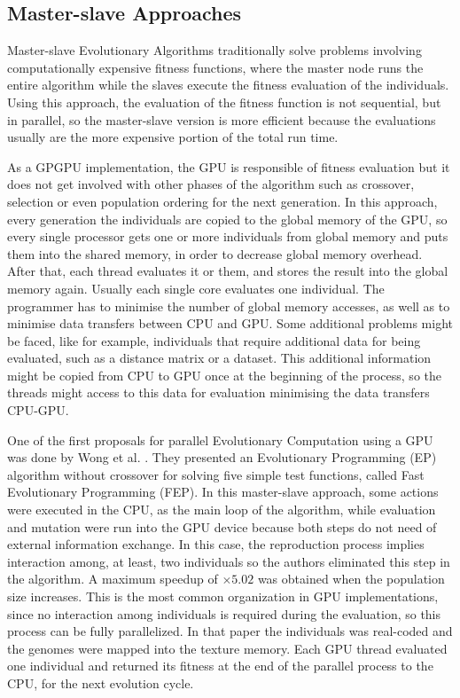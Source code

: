 \documentclass{comjnl}
\begin{document}
\subsection{Master-slave Approaches}
\label{sec:masterSlave}

Master-slave Evolutionary Algorithms traditionally solve problems involving computationally expensive fitness functions, where the master node runs the entire algorithm while the slaves execute the fitness evaluation of the individuals. Using this approach, the evaluation of the fitness function is not sequential, but in parallel, so the master-slave version is more efficient because the evaluations usually are the more expensive portion of the total run time.

As a GPGPU implementation, the GPU is responsible of fitness evaluation but it does not get involved with other phases of the algorithm such as crossover, selection or even population ordering for the next generation. In this approach, every generation the individuals are copied to the global memory of the GPU, so every single processor gets one or more individuals from global memory and puts them into the shared memory, in order to decrease global memory overhead. After that, each thread evaluates it or them, and stores the result into the global memory again. Usually each single core evaluates one individual. The programmer has to minimise the number of global memory accesses, as well as to minimise data transfers between CPU and GPU. Some additional problems might be faced, like for example, individuals that require additional data for being evaluated, such as a distance matrix or a dataset. This additional information might be copied from CPU to GPU once at the beginning of the process, so the threads might access to this data for evaluation minimising the data transfers CPU-GPU. 

One of the first proposals for parallel Evolutionary Computation using a GPU was done by Wong et al. \cite{man-leung-wong-parallel-2005}. They presented an Evolutionary Programming (EP) algorithm without crossover for solving five simple test functions, called Fast Evolutionary Programming (FEP). In this master-slave approach, some actions were executed in the CPU, as the main loop of the algorithm, while evaluation and mutation were run into the GPU device because both steps do not need of external information exchange. In this case, the reproduction process implies interaction among, at least, two individuals so the authors eliminated this step in the algorithm. A maximum speedup of $\times5.02$ was obtained when the population size increases. This is the most common organization in GPU implementations, since no interaction among individuals is required during the evaluation, so this process can be fully parallelized. In that paper the individuals was real-coded and the genomes were mapped into the texture memory. Each GPU thread evaluated one individual and returned its fitness at the end of the parallel process to the CPU, for the next evolution cycle.
\end{document}
